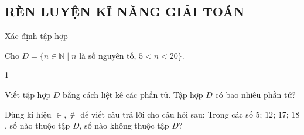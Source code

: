 \subsection{RÈN LUYỆN KĨ NĂNG GIẢI TOÁN}
\begin{dang}{Xác định tập hợp}
\end{dang}

\begin{vd}%
	Cho $D=\{n \in \mathbb{N} \mid n$ là số nguyên tố, $5<n<20\}$.
	\begin{enumEX}{1}
		\item Viết tập hợp $D$ bằng cách liệt kê các phần tử. Tập hợp $D$ có bao nhiêu phần tử?
		\item Dùng kí hiệu $\in, \notin$ để viết câu trả lời cho câu hỏi sau: Trong các số $5$; $12$; $17$; $18$, số nào thuộc tập $D$, số nào không thuộc tập $D$?
	\end{enumEX}
\end{vd}

